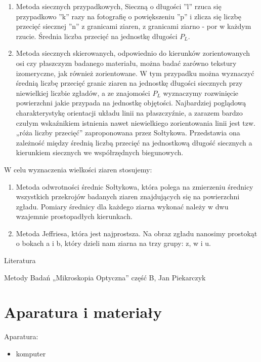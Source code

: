 \documentclass[a4paper,12pt]{article}
\begin{document}
\begin{enumerate}
    \item  Metoda siecznych przypadkowych, Sieczną o długości ”l” rzuca się przypadkowo ”k” razy na fotografię o powiększeniu ”p” i zlicza się liczbę przecięć siecznej ”n” z granicami ziaren, z granicami ziarno - por w każdym rzucie. Średnia liczba przecięć na jednostkę długości $P_L$.
    \item  Metoda siecznych skierowanych, odpowiednio do kierunków zorientowanych osi czy płaszczyzn badanego materiału, można badać zarówno tekstury izomeryczne, jak również zorientowane. W tym przypadku można wyznaczyć średnią liczbę przecięć granic ziaren na jednostkę długości siecznych przy niewielkiej liczbie zgładów, a ze znajomości $P_L$ wyznaczymy rozwinięcie powierzchni jakie przypada na jednostkę objętości. Najbardziej poglądową charakterystykę orientacji układu linii na płaszczyźnie, a zarazem bardzo czułym wskaźnikiem istnienia nawet niewielkiego zorientowania linii jest tzw. „róża liczby przecięć” zaproponowana przez Sołtykowa. Przedstawia ona zależność między średnią liczbą przecięć na jednostkową długość siecznych a kierunkiem siecznych we współrzędnych biegunowych.
\end{enumerate}

W celu wyznaczenia wielkości ziaren  stosujemy:

\begin{enumerate}
    \item Metoda odwrotności średnic Sołtykowa, która polega na zmierzeniu średnicy wszystkich przekrojów badanych ziaren znajdujących się na powierzchni zgładu. Pomiary średnicy dla każdego ziarna wykonać należy  w dwu wzajemnie prostopadłych kierunkach.
    \item Metoda Jeffriesa, która jest najprostsza. Na obraz zgładu nanosimy prostokąt o bokach a i b, który dzieli nam ziarna na trzy grupy: z, w i u.
\end{enumerate}


Literatura

Metody Badań „Mikroskopia Optyczna” część B, Jan Piekarczyk

\newpage

\section{Aparatura i materiały}

Aparatura:
\begin{itemize}
    \item komputer
\end{itemize}
\end{document}
